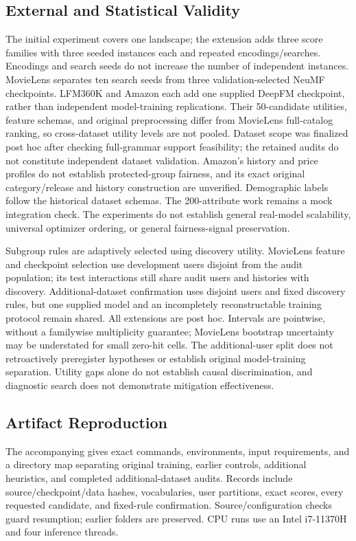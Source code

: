 \subsection{External and Statistical Validity}
The initial experiment covers one landscape; the extension adds three score families with three seeded instances each and repeated encodings/searches. Encodings and search seeds do not increase the number of independent instances. MovieLens separates ten search seeds from three validation-selected NeuMF checkpoints. LFM360K and Amazon each add one supplied DeepFM checkpoint, rather than independent model-training replications. Their 50-candidate utilities, feature schemas, and original preprocessing differ from MovieLens full-catalog ranking, so cross-dataset utility levels are not pooled. Dataset scope was finalized post hoc after checking full-grammar support feasibility; the retained audits do not constitute independent dataset validation. Amazon's history and price profiles do not establish protected-group fairness, and its exact original category/release and history construction are unverified. Demographic labels follow the historical dataset schemas. The 200-attribute work remains a mock integration check. The experiments do not establish general real-model scalability, universal optimizer ordering, or general fairness-signal preservation.

Subgroup rules are adaptively selected using discovery utility. MovieLens feature and checkpoint selection use development users disjoint from the audit population; its test interactions still share audit users and histories with discovery. Additional-dataset confirmation uses disjoint users and fixed discovery rules, but one supplied model and an incompletely reconstructable training protocol remain shared. All extensions are post hoc. Intervals are pointwise, without a familywise multiplicity guarantee; MovieLens bootstrap uncertainty may be understated for small zero-hit cells. The additional-user split does not retroactively preregister hypotheses or establish original model-training separation. Utility gaps alone do not establish causal discrimination, and diagnostic search does not demonstrate mitigation effectiveness.

\subsection{Artifact Reproduction}
The accompanying  gives exact commands, environments, input requirements, and a directory map separating original training, earlier controls, additional heuristics, and completed additional-dataset audits. Records include source/checkpoint/data hashes, vocabularies, user partitions, exact scores, every requested candidate, and fixed-rule confirmation. Source/configuration checks guard resumption; earlier folders are preserved. CPU runs use an Intel i7-11370H and four inference threads.

